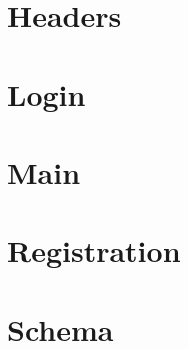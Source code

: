 \documentclass{article}
\title{\Title}
\author{\Author}
\date{\Date}
\begin{document}
\section{Headers}



\newpage

\section{Login}


\newpage

\section{Main}


\newpage

\section{Registration}


\newpage

\section{Schema}


\newpage
\end{document}
